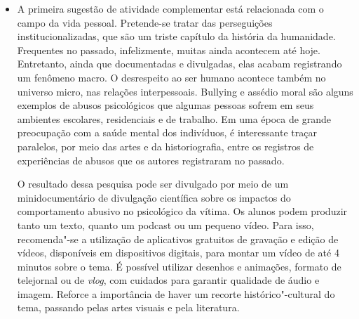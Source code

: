 \documentclass[12pt]{extarticle}
\begin{document}
\begin{itemize}
\item A primeira sugestão de atividade complementar está
relacionada com o campo da vida pessoal.
Pretende-se tratar das perseguições institucionalizadas,
que são um triste capítulo da história da
humanidade. Frequentes no passado, infelizmente, muitas ainda
acontecem até hoje. Entretanto, ainda que documentadas e divulgadas,
elas acabam registrando um fenômeno macro. O desrespeito ao ser humano
acontece também no universo micro, nas relações interpessoais.
Bullying e assédio moral são alguns exemplos de abusos psicológicos
que algumas pessoas sofrem em seus ambientes escolares, residenciais e
de trabalho. Em uma época de grande preocupação com a saúde mental dos
indivíduos, é interessante traçar paralelos, por meio das artes e da
historiografia, entre os registros de experiências de abusos que os
autores registraram no passado.

O resultado dessa pesquisa pode ser divulgado por meio de
um minidocumentário de divulgação científica sobre os
impactos do comportamento abusivo no psicológico da vítima. Os alunos
podem produzir tanto um texto, quanto um podcast ou um pequeno vídeo.
Para isso, recomenda"-se a utilização de aplicativos gratuitos de
gravação e edição de vídeos, disponíveis em dispositivos digitais,
para montar um vídeo de até 4 minutos sobre o tema. É possível
utilizar desenhos e animações, formato de telejornal ou de
\emph{vlog}, com cuidados para garantir qualidade de áudio e imagem.
Reforce a importância de haver um recorte histórico"-cultural do tema,
passando pelas artes visuais e pela literatura.

\begin{comment}
\subsection{Campo de atuação na vida pública}

\begin{quote}
No cerne do campo de atuação na vida pública estão a ampliação da
participação em diferentes instâncias da vida pública, a defesa dos
direitos, o domínio básico de textos legais e a discussão e o debate de
ideias, propostas e projetos. {[}\ldots{}{]}

Ainda no domínio das ênfases, indica"-se um conjunto de habilidades que
se relacionam com a análise, discussão, elaboração e desenvolvimento de
propostas de ação e de projetos culturais e de intervenção social.
(\textsc{bncc}, p. 494)
\end{quote}
\end{comment}


\end{itemize}
\end{document}
